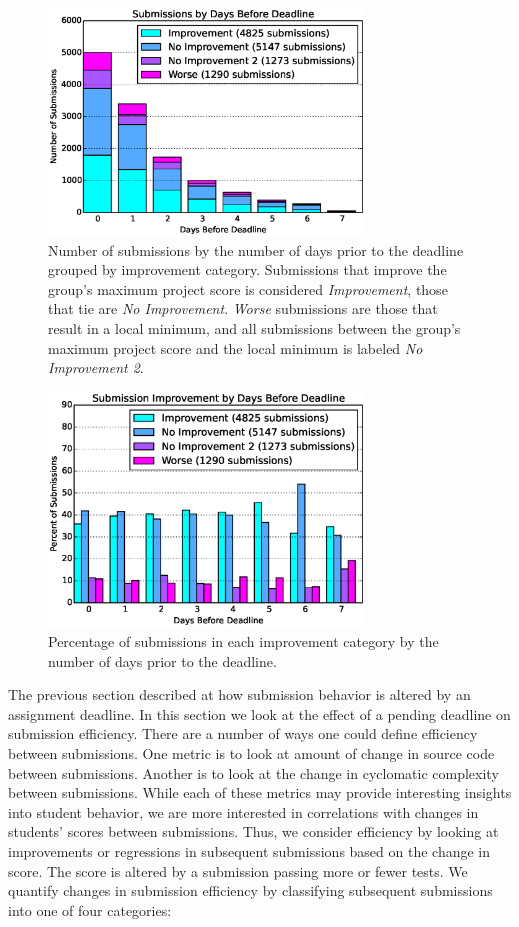 \begin{figure}[!t]
\centering \includegraphics[width=3.3in]{graphs/Submissions_by_Days_Before_Deadline.eps}
\caption{Number of submissions by the number of days prior to the deadline
  grouped by improvement category.  Submissions that improve the group's
  maximum project score is considered \emph{Improvement}, those that tie are
  \emph{No Improvement}. \emph{Worse} submissions are those that result in a
  local minimum, and all submissions between the group's maximum project score
  and the local minimum is labeled \emph{No Improvement 2}.}
\end{figure}

\begin{figure}[!t]
\centering \includegraphics[width=3.3in]{graphs/Submission_Improvement_by_Days_Before_Deadline.eps}
\caption{Percentage of submissions in each improvement category by the number
  of days prior to the deadline.}
\end{figure}

The previous section described at how submission behavior is altered by an
assignment deadline. In this section we look at the effect of a pending
deadline on submission efficiency. There are a number of ways one could define
efficiency between submissions. One metric is to look at amount of change in
source code between submissions. Another is to look at the change in cyclomatic
complexity between submissions. While each of these metrics may provide
interesting insights into student behavior, we are more interested in
correlations with changes in students' scores between submissions. Thus, we
consider efficiency by looking at improvements or regressions in subsequent
submissions based on the change in score. The score is altered by a submission
passing more or fewer tests. We quantify changes in submission efficiency by
classifying subsequent submissions into one of four categories:

